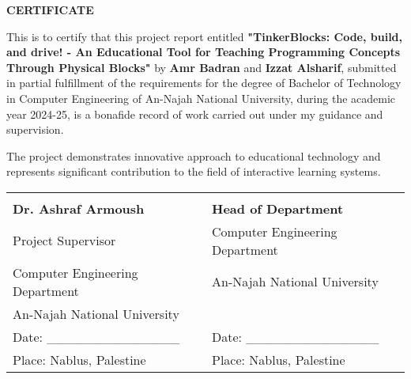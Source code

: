 \begin{center}
    \Large \textbf{CERTIFICATE}
    \end{center}
    
    \vspace{2cm}
    
    This is to certify that this project report entitled \textbf{"TinkerBlocks: Code, build, and drive! - An Educational Tool for Teaching Programming Concepts Through Physical Blocks"} by \textbf{Amr Badran} and \textbf{Izzat Alsharif}, submitted in partial fulfillment of the requirements for the degree of Bachelor of Technology in Computer Engineering of An-Najah National University, during the academic year 2024-25, is a bonafide record of work carried out under my guidance and supervision.
    
    The project demonstrates innovative approach to educational technology and represents significant contribution to the field of interactive learning systems.
    
    \vspace{3cm}
    
    \begin{center}
    \begin{tabular}{p{5cm} p{5cm}}
    & \\[2cm]
    \textbf{Dr. Ashraf Armoush} & \textbf{Head of Department} \\
    Project Supervisor & Computer Engineering Department \\
    Computer Engineering Department & An-Najah National University \\
    An-Najah National University & \\[1cm]
    Date: \_\_\_\_\_\_\_\_\_\_\_\_\_\_ & Date: \_\_\_\_\_\_\_\_\_\_\_\_\_\_ \\
    Place: Nablus, Palestine & Place: Nablus, Palestine \\
    \end{tabular}
    \end{center}